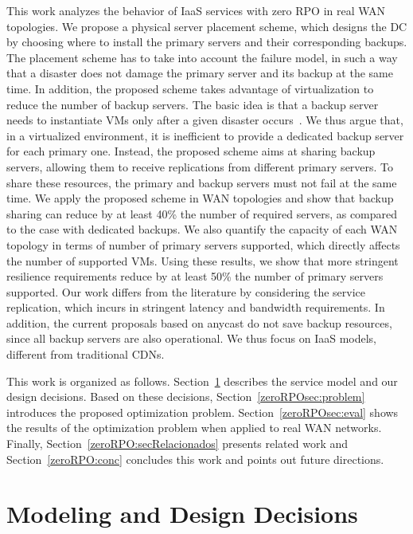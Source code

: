 \documentclass[preprint]{elsarticle}
\begin{document}
This work analyzes the behavior of IaaS services with zero RPO in real WAN topologies. We propose a physical server placement scheme, which designs the DC by choosing where to install the primary servers and their corresponding backups. The placement scheme has to take into account the failure model, in such a way that a disaster does not damage the primary server and its backup at the same time. In addition, the proposed scheme takes advantage of virtualization to reduce the number of backup servers. The basic idea is that a backup server needs to instantiate VMs only after a given disaster occurs~\cite{wood2010disaster}. We thus argue that, in a virtualized environment, it is inefficient to provide a dedicated backup server for each primary one. Instead, the proposed scheme aims at sharing backup servers, allowing them to receive replications from different primary servers. To share these resources, the primary and backup servers must not fail at the same time. We apply the proposed scheme in WAN topologies and show that 
backup sharing can reduce by at least 40\% the number of required servers,
as compared to the case with dedicated backups. We also quantify the capacity of each WAN topology in terms of number of primary servers supported, which directly affects the number of supported VMs. Using these results, we show that more stringent resilience requirements reduce by at least 50\% the number of primary servers supported. Our work differs from the literature by considering the service replication, which incurs in stringent latency and bandwidth requirements. In addition, the current proposals based on anycast do not save backup resources, since all backup servers are also operational. We thus focus on IaaS models, different from traditional CDNs.

This work is organized as follows. Section~\ref{zeroRPOsec:model} describes the service model and our design decisions.
Based on these decisions, Section~\ref{zeroRPOsec:problem} introduces the proposed optimization problem. Section~\ref{zeroRPOsec:eval} shows the results of the optimization problem when applied to real WAN networks. Finally, Section~\ref{zeroRPO:secRelacionados} presents related work and Section~\ref{zeroRPO:conc} concludes this work and points out future directions.

\section{Modeling and Design Decisions}
\label{zeroRPOsec:model}
\end{document}
